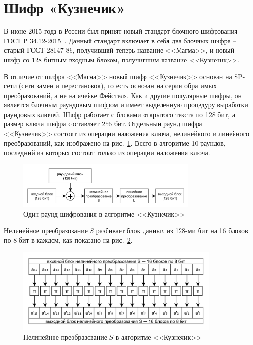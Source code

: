 \section{Шифр «Кузнечик»}\label{section-grig}

В июне 2015 года в России был принят новый стандарт блочного шифрования ГОСТ Р 34.12-2015~\cite{GOST-R:34.12-2015}. Данный стандарт включает в себя два блочных шифра -- старый ГОСТ 28147-89, получивший теперь название <<Магма>>, и новый шифр со 128-битным входным блоком, получившим название <<Кузнечик>>.

В отличие от шифра <<Магма>> новый шифр <<Кузнечик>> основан на SP-сети (сети замен и перестановок), то есть основан на серии обратимых преобразований, а не на ячейке Фейстеля. Как и другие популярные шифры, он является блочным раундовым шифром и имеет выделенную процедуру выработки раундовых ключей. Шифр работает с блоками открытого текста по 128 бит, а размер ключа шифра составляет 256 бит. Отдельный раунд шифра <<Кузнечик>> состоит из операции наложения ключа, нелинейного и линейного преобразований, как изображено на рис.~\ref{fig:kuznechik-step}. Всего в алгоритме 10 раундов, последний из которых состоит только из операции наложения ключа. 

\begin{figure}[htb]
	\centering
	\includegraphics[width=0.8\textwidth]{pic/kuznechik-step}
  \caption{Один раунд шифрования в алгоритме <<Кузнечик>>}
  \label{fig:kuznechik-step}
\end{figure}

Нелинейное преобразование $S$ разбивает блок данных из 128-ми бит на 16 блоков по 8 бит в каждом, как показано на рис.~\ref{fig:kuznechik-s}.

\begin{figure}[htb]
	\centering
	\includegraphics[width=0.9\textwidth]{pic/kuznechik-s}
  \caption{Нелинейное преобразование $S$ в алгоритме <<Кузнечик>>}
  \label{fig:kuznechik-s}
\end{figure}

